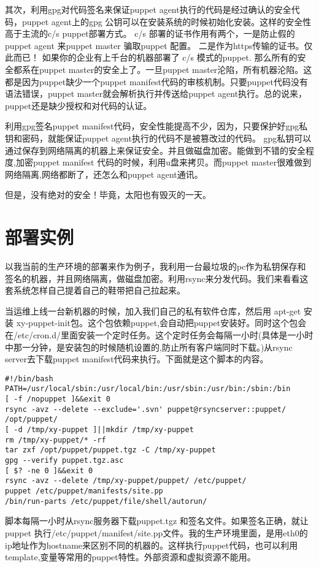 \par
其次，利用gpg对代码签名来保证puppet agent执行的代码是经过确认的安全代码，puppet agent上的gpg 公钥可以在安装系统的时候初始化安装。这样的安全性高于主流的c/s puppet部署方式。 c/s 部署的证书作用有两个，一是防止假的puppet agent 来puppet master 骗取puppet 配置。 二是作为https传输的证书。仅此而已！ 如果你的企业有上千台的机器部署了 c/s 模式的puppet. 那么所有的安全都系在puppet master的安全上了。一旦puppet master沦陷，所有机器沦陷。这都是因为puppet缺少一个puppet manifest代码的审核机制。只要puppet代码没有语法错误，puppet master就会解析执行并传送给puppet agent执行。总的说来，puppet还是缺少授权和对代码的认证。\par
利用gpg签名puppet manifest代码，安全性能提高不少，因为，只要保护好gpg私钥和密码，就能保证puppet agent执行的代码不是被篡改过的代码。 gpg私钥可以通过保存到网络隔离的机器上来保证安全。并且做磁盘加密。能做到不错的安全程度,加密puppet manifest 代码的时候，利用u盘来拷贝。而puppet master很难做到网络隔离,网络都断了，还怎么和puppet agent通讯。\par
但是，没有绝对的安全！毕竟，太阳也有毁灭的一天。



\section{\msyh \small 部署实例 }
\fzsk
以我当前的生产环境的部署来作为例子，我利用一台最垃圾的pc作为私钥保存和签名的机器，并且网络隔离，做磁盘加密。利用rsync来分发代码。我们来看看这套系统怎样自己提着自己的鞋带把自己拉起来。
\par

当运维上线一台新机器的时候，加入我们自己的私有软件仓库，然后用 apt-get 安装 xy-puppet-init包。这个包依赖puppet,会自动把puppet安装好。同时这个包会在/etc/cron.d/里面安装一个定时任务。这个定时任务会每隔一小时(具体是一小时中那一分钟，是安装包的时候随机设置的,防止所有客户端同时下载。)从rsync server去下载puppet manifest代码来执行。下面就是这个脚本的内容。

\codefont\tiny \begin{lstlisting}
#!/bin/bash
PATH=/usr/local/sbin:/usr/local/bin:/usr/sbin:/usr/bin:/sbin:/bin
[ -f /nopuppet ]&&exit 0
rsync -avz --delete --exclude='.svn' puppet@rsyncserver::puppet/ /opt/puppet/
[ -d /tmp/xy-puppet ]||mkdir /tmp/xy-puppet
rm /tmp/xy-puppet/* -rf
tar zxf /opt/puppet/puppet.tgz -C /tmp/xy-puppet
gpg --verify puppet.tgz.asc
[ $? -ne 0 ]&&exit 0
rsync -avz --delete /tmp/xy-puppet/puppet/ /etc/puppet/
puppet /etc/puppet/manifests/site.pp
/bin/run-parts /etc/puppet/file/shell/autorun/
\end{lstlisting} \fzsk

\fzsk\normalsize

脚本每隔一小时从rsync服务器下载puppet.tgz 和签名文件。如果签名正确，就让puppet 执行/etc/puppet/manifest/site.pp文件。我的生产环境里面，是用eth0的ip地址作为hostname来区别不同的机器的。这样执行puppet代码，也可以利用template,变量等常用的puppet特性。外部资源和虚拟资源不能用。


